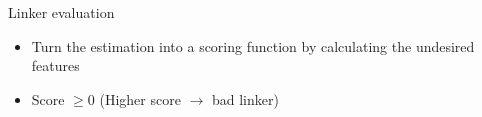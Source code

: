\documentclass{beamer}
\begin{document}
\begin{frame}{Linker evaluation}
\begin{itemize}

 \item Turn the estimation into a scoring function by calculating the undesired features\\

%   
  
 \item Score $\geqslant 0$ (Higher score $\rightarrow$ bad linker)
\end{itemize}

 

\end{frame}
\end{document}
